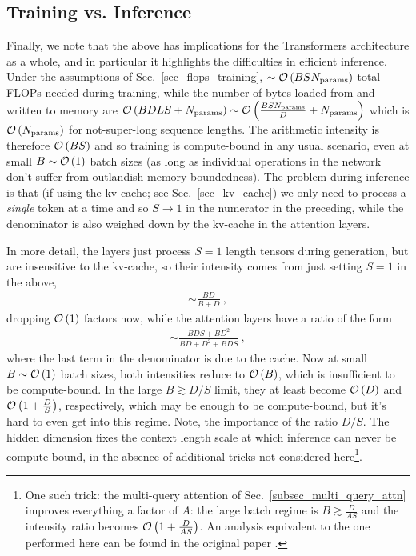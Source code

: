 \documentclass[11pt]{article}
\begin{document}
\subsection{Training vs. Inference}

Finally, we note that the above has implications for the Transformers architecture as a whole, and
in particular it highlights the difficulties in efficient inference. Under the assumptions of
Sec.~\ref{sec_flops_training}, $ \sim \mathcal{O} \left( BSN _{ {\rm params}  }  \right)  $
total FLOPs needed during training, while the number of bytes loaded from and written to memory are
$ \mathcal{O} \left( BDLS + N _{ {\rm params}  } \right)  \sim \mathcal{O} \left( \frac{ BS N _{ {\rm params}  } }{ D}+ N _{ {\rm params}  } \right)  $
which is $ \mathcal{O} \left( N _{ {\rm  params}  } \right)  $ for not-super-long sequence lengths.  The
arithmetic intensity is therefore $ \mathcal{O} \left( BS \right)  $ and so training is compute-bound in any
usual scenario, even at small $B \sim \mathcal{O} \left( 1 \right)  $ batch sizes (as long as individual operations in the network don't suffer from outlandish
memory-boundedness). The problem during inference is that (if using the kv-cache; see
Sec.~\ref{sec_kv_cache}) we only need to process a \textit{single} token at a time and so $ S
	\longrightarrow 1 $ in the numerator in the preceding, while the denominator is also weighed down by
the  kv-cache in the attention layers.

In more detail, the  layers just process $ S=1 $ length tensors during generation, but
are insensitive to the kv-cache, so their intensity comes from just setting $ S=1 $ in the above,
\begin{align}
	\sim \frac{ BD  }{ B + D } \ ,
\end{align}
dropping $\mathcal{O} \left( 1 \right)  $ factors now, while the attention layers have a ratio of the form
\begin{align}
	\sim \frac{ BDS+BD ^{ 2 } }{ BD + D ^{ 2 }+BDS }\ ,
\end{align}
where the last term in the denominator is due to the cache. Now at small $B \sim \mathcal{O} \left( 1
	\right)  $ batch sizes, both intensities reduce to $ \mathcal{O} \left( B \right)  $, which is
insufficient to be compute-bound.  In the large $ B \gtrsim D/S $ limit, they at least become $ \mathcal{O} \left( D
	\right)  $ and $ \mathcal{O} \left( 1 + \frac{ D }{ S } \right)  $, respectively, which may be enough to be
compute-bound, but it's hard to even get into this regime. Note, the importance of the ratio $ D/S
$. The hidden dimension fixes the context length scale at which inference can never be
compute-bound, in the absence of additional tricks not considered here\footnote{One such trick: the
	multi-query attention of Sec.~\ref{subsec_multi_query_attn} improves everything a factor of $
		A $: the large batch regime is $ B \gtrsim \frac{ D }{ AS }$ and the intensity ratio becomes
	$ \mathcal{O} \left( 1 + \frac{ D }{ AS } \right)  $. An analysis equivalent to the one performed here can be found in the original paper
	\cite{shazeer2019fast}.}.
\end{document}
